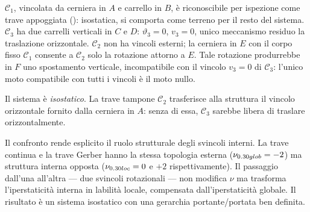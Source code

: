\begin{esempio}
\begin{svolgimento}
		$\mathcal{C}_1$, vincolata da cerniera in $A$ e
		carrello in $B$, è riconoscibile per ispezione
		come trave appoggiata ():
		isostatica, si comporta come terreno per il resto
		del sistema.
		$\mathcal{C}_3$ ha due carrelli verticali in $C$
		e $D$: $\vartheta_3 = 0$, $v_3 = 0$, unico
		meccanismo residuo la traslazione orizzontale.
		$\mathcal{C}_2$ non ha vincoli esterni; la cerniera
		in $E$ con il corpo fisso $\mathcal{C}_1$ consente
		a $\mathcal{C}_2$ solo la rotazione attorno a $E$.
		Tale rotazione produrrebbe in $F$ uno spostamento
		verticale, incompatibile con il vincolo $v_3 = 0$
		di $\mathcal{C}_3$: l'unico moto compatibile con
		tutti i vincoli è il moto nullo.
		
		Il sistema è \textit{isostatico}. La trave
		tampone $\mathcal{C}_2$ trasferisce alla
		struttura il vincolo orizzontale fornito dalla
		cerniera in $A$: senza di essa, $\mathcal{C}_3$
		sarebbe libera di traslare orizzontalmente.
	\end{svolgimento}
	
	\begin{oss}
		Il confronto rende esplicito il ruolo strutturale
		degli svincoli interni. La trave continua e la
		trave Gerber hanno la stessa topologia esterna
		($\nu_{\rm glob} = -2$) ma struttura interna
		opposta ($\nu_{\rm loc} = 0$ e $+2$
		rispettivamente). Il passaggio dall'una all'altra
		--- due svincoli rotazionali --- non modifica
		$\nu$ ma trasforma l'iperstaticità interna in
		labilità locale, compensata dall'iperstaticità
		globale. Il risultato è un sistema isostatico
		con una gerarchia portante/portata ben definita.
	\end{oss}
\end{esempio}




